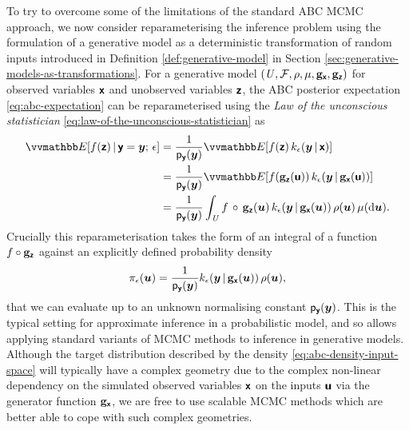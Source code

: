 To try to overcome some of the limitations of the standard \ac{ABC} \ac{MCMC} approach, we now consider reparameterising the inference problem using the formulation of a generative model as a deterministic transformation of random inputs introduced in Definition \ref{def:generative-model} in Section \ref{sec:generative-models-as-transformations}. For a generative model $(\mathit{U},\mathcal{F}\kern-.2pt,\rho,\mu,{\mathbf{g}}_{\boldsymbol{\mathsf{x}}},{\mathbf{g}}_{\boldsymbol{\mathsf{z}}})$ for observed variables $\boldsymbol{\mathsf{x}}$ and unobserved variables $\boldsymbol{\mathsf{z}}$, the \ac{ABC} posterior expectation \eqref{eq:abc-expectation} can be reparameterised using the \emph{Law of the unconscious statistician} \eqref{eq:law-of-the-unconscious-statistician} as
\begin{align}\nonumber
  \expc{f(\rvct{z}) \gvn \rvct{y}=\vct{y};\,\epsilon} &=
  \frac{1}{\pden{\rvct{y}}(\vct{y})} \expc{f(\rvct{z}) \, k_\epsilon(\vct{y}\gvn\rvct{x})}
  \\\label{eq:abc-expectation-input-space}
  &=
  \frac{1}{\pden{\rvct{y}}(\vct{y})} 
  \expc{f\lpa\genfunc_{\rvct{z}}(\rvct{u})\rpa \, k_\epsilon\lpa\vct{y}\gvn\genfunc_{\rvct{x}}(\rvct{u})\rpa}
  \\ \nonumber
  &=
  \frac{1}{\pden{\rvct{y}}(\vct{y})}
  \int_{\set{U}} 
    f\,\circ\,\genfunc_{\rvct{z}}(\vct{u}) \,
    k_\epsilon{\lpa\vct{y}\gvn\genfunc_{\rvct{x}}(\vct{u})\rpa}\,
    \rho(\vct{u})
  \,\mu(\dr\vct{u}).
\end{align}
Crucially this reparameterisation takes the form of an integral of a function $f\circ{\mathbf{g}}_{\boldsymbol{\mathsf{z}}}$ against an explicitly defined probability density
\begin{equation}\label{eq:abc-density-input-space}
  \pi_\epsilon(\vct{u}) = \frac{1}{\pden{\rvct{y}}(\vct{y})} 
  k_\epsilon{\lpa\vct{y}\gvn\genfunc_{\rvct{x}}(\vct{u})\rpa}\,\rho(\vct{u}),
\end{equation}
that we can evaluate up to an unknown normalising constant $\mathsf{p}_{\boldsymbol{\mathsf{y}}}(\boldsymbol{y})$. This is the typical setting for approximate inference in a probabilistic model, and so allows applying standard variants of \ac{MCMC} methods to inference in generative models. Although the target distribution described by the density \eqref{eq:abc-density-input-space} will typically have a complex geometry due to the complex non-linear dependency on the simulated observed variables $\boldsymbol{\mathsf{x}}$ on the inputs $\boldsymbol{\mathsf{u}}$ via the generator function ${\mathbf{g}}_{\boldsymbol{\mathsf{x}}}$, we are free to use scalable \ac{MCMC} methods which are better able to cope with such complex geometries. 

